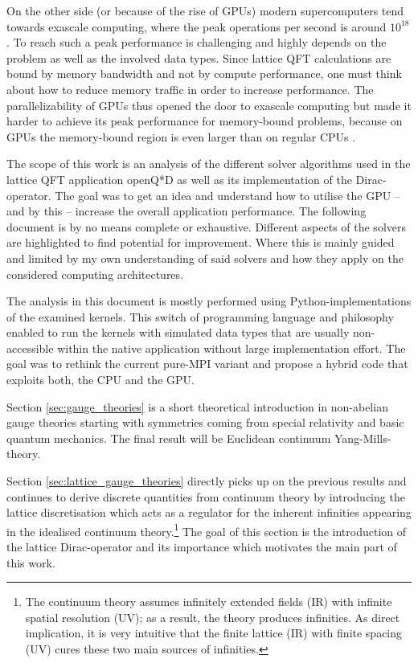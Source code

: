 \documentclass{article}
\theoremstyle{plain} %
\theoremstyle{convention} %
\theoremstyle{remark} %
\numberwithin{equation}{section}
\begin{document}
On the other side (or because of the rise of GPUs) modern supercomputers tend towards exascale computing, where the peak operations per second is around $10^{18}$ \cite{top500}. To reach such a peak performance is challenging and highly depends on the problem as well as the involved data types. Since lattice QFT calculations are bound by memory bandwidth and not by compute performance, one must think about how to reduce memory traffic in order to increase performance. The parallelizability of GPUs thus opened the door to exascale computing but made it harder to achieve its peak performance for memory-bound problems, because on GPUs the memory-bound region is even larger than on regular CPUs \cite{davis2012}.

The scope of this work is an analysis of the different solver algorithms used in the lattice QFT application openQ*D \cite{openqxd} as well as its implementation of the Dirac-operator. The goal was to get an idea and understand how to utilise the GPU  -- and by this -- increase the overall application performance. The following document is by no means complete or exhaustive. Different aspects of the solvers are highlighted to find potential for improvement. Where this is mainly guided and limited by my own understanding of said solvers and how they apply on the considered computing architectures.

The analysis in this document is mostly performed using Python-implementations of the examined kernels. This switch of programming language and philosophy enabled to run the kernels with simulated data types that are usually non-accessible within the native application without large implementation effort. The goal was to rethink the current pure-MPI variant and propose a hybrid code that exploits both, the CPU and the GPU.

Section \ref{sec:gauge_theories} is a short theoretical introduction in non-abelian gauge theories starting with symmetries coming from special relativity and basic quantum mechanics. The final result will be Euclidean continuum Yang-Mills-theory.

Section \ref{sec:lattice_gauge_theories} directly picks up on the previous results and continues to derive discrete quantities from continuum theory by introducing the lattice discretisation which acts as a regulator for the inherent infinities appearing in the idealised continuum theory.\footnote{The continuum theory assumes infinitely extended fields (IR) with infinite spatial resolution (UV); as a result, the theory produces infinities. As direct implication, it is very intuitive that the finite lattice (IR) with finite spacing (UV) cures these two main sources of infinities.} The goal of this section is the introduction of the lattice Dirac-operator and its importance which motivates the main part of this work.
\end{document}
